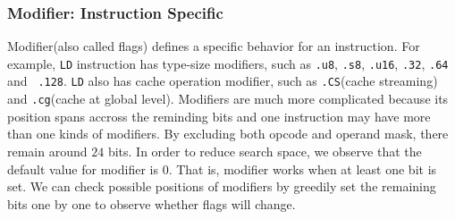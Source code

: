 \subsubsection{Modifier: Instruction Specific}

Modifier(also called flags) defines a specific behavior for an instruction. For example,
{\tt LD} instruction has type-size modifiers, such as {\tt .u8}, {\tt .s8}, {\tt .u16}, {\tt .32}, {\tt .64} and {\tt 
.128}. {\tt LD} also has cache operation modifier, such as {\tt .CS}(cache streaming) and {\tt .cg}(cache at global 
level). Modifiers are much more complicated because its position spans accross the reminding bits and one instruction 
may have more than one kinds of modifiers. By excluding both opcode and operand mask, there remain around $24$ bits. In 
order to reduce search space, we observe that the default value for modifier is $0$. That is, modifier works when at 
least one bit is set. We can check possible positions of modifiers by greedily set the remaining bits one by one to 
observe whether flags will change.
